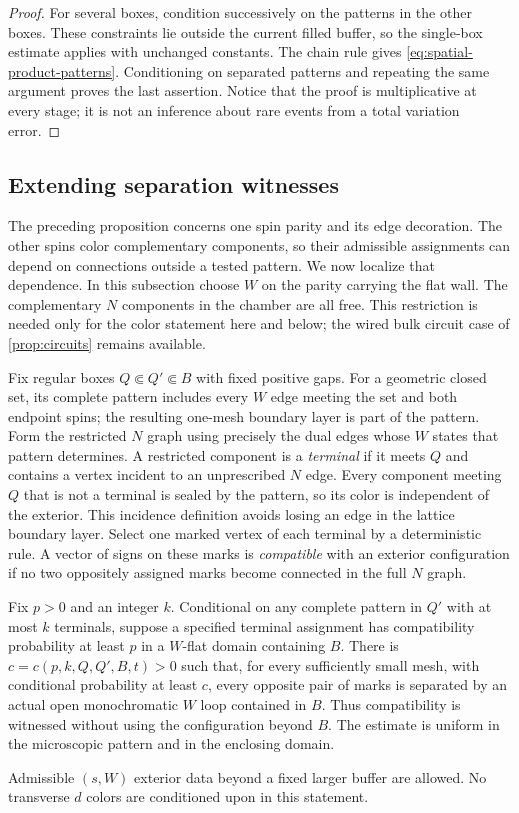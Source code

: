 \begin{proof}
For several boxes, condition successively on the patterns in the
other boxes. These constraints lie outside the current filled
buffer, so the single-box estimate applies with unchanged constants.
The chain rule gives \eqref{eq:spatial-product-patterns}. Conditioning
on separated patterns and repeating the same argument proves the
last assertion. Notice that the proof is multiplicative at every
stage; it is not an inference about rare events from a total
variation error.
\end{proof}

\subsection{Extending separation witnesses}

The preceding proposition concerns one spin parity and its edge
decoration. The other spins color complementary components, so their
admissible assignments can depend on connections outside a tested
pattern. We now localize that dependence. In this subsection choose
$W$ on the parity carrying the flat wall. The complementary $N$
components in the chamber are all free. This restriction is needed
only for the color statement here and below; the wired bulk circuit
case of \cref{prop:circuits} remains available.

Fix regular boxes $Q\Subset Q'\Subset B$ with fixed positive gaps.
For a geometric closed set, its complete pattern includes every $W$
edge meeting the set and both endpoint spins; the resulting one-mesh
boundary layer is part of the pattern. Form the restricted $N$ graph
using precisely the dual edges whose $W$ states that pattern
determines. A restricted component is a \emph{terminal} if it meets
$Q$ and contains a vertex incident to an unprescribed $N$ edge.
Every component meeting $Q$ that is not a terminal is sealed by the
pattern, so its color is independent of the exterior. This incidence
definition avoids losing an edge in the lattice boundary layer.
Select one marked vertex of each terminal by a deterministic rule.
A vector of signs on these marks is \emph{compatible} with an
exterior configuration if no two oppositely assigned marks become
connected in the full $N$ graph.

\begin{lemma}
\label{lem:buffered-witnesses}
Fix $p>0$ and an integer $k$. Conditional on any complete pattern
in $Q'$ with at most $k$ terminals, suppose a specified terminal
assignment has compatibility probability at least $p$ in a
$W$-flat domain containing $B$. There is
$c=c(p,k,Q,Q',B,t)>0$ such that, for every sufficiently small mesh,
with conditional probability at least $c$, every opposite pair
of marks is separated by an actual open monochromatic $W$ loop
contained in $B$. Thus compatibility is witnessed without using
the configuration beyond $B$. The estimate is uniform in the
microscopic pattern and in the enclosing domain.

Admissible $(s,W)$ exterior data beyond a fixed larger buffer are
allowed. No transverse $d$ colors are conditioned upon in this
statement.
\end{lemma}

